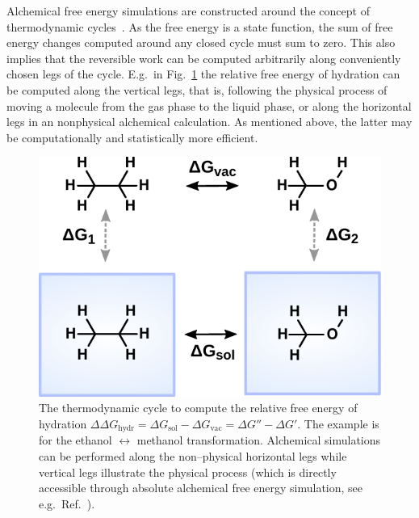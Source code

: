 \documentclass[journal=jctcce,manuscript=article]{achemso}
\begin{document}
Alchemical free energy simulations are constructed around the concept
of thermodynamic cycles~\cite{Tembe1984281}.  As the free energy is a state function, the sum of free energy changes
computed around any closed cycle must sum to zero.  This also implies
that the reversible work can be computed arbitrarily along
conveniently chosen legs of the cycle.  E.g.\ in
Fig.~\ref{fig:thermocycle} the relative free energy of hydration can
be computed along the vertical legs, that is, following the physical
process of moving a molecule from the gas phase to the liquid phase,
or along the horizontal legs in an nonphysical alchemical calculation.
As mentioned above, the latter may be computationally and
statistically more efficient.

\begin{figure}[ht]
  \includegraphics[scale=1.0]{figures/thermocycle.pdf}
  \caption{The thermodynamic cycle to compute the relative free energy
    of hydration
    $\Delta\Delta G_{\mathrm{hydr}}=\Delta G_{\mathrm{sol}}-\Delta
    G_{\mathrm{vac}}=\Delta G'' - \Delta G'$.  The example is for the
    ethanol $\leftrightarrow$ methanol transformation.  Alchemical
    simulations can be performed along the non--physical horizontal
    legs while vertical legs illustrate the physical process (which is
    directly accessible through absolute alchemical free energy
    simulation, see e.g.\ Ref.~).}
  \label{fig:thermocycle}
\end{figure}
\end{document}

